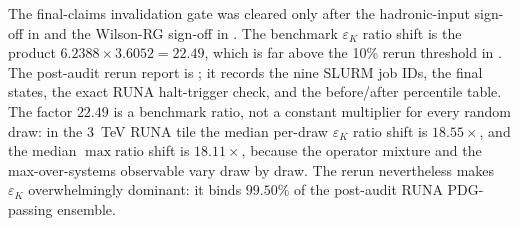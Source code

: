 \documentclass[11pt]{article}
\newcommand{\eK}{\varepsilon_K}
\begin{document}
The final-claims invalidation gate was cleared only after the
hadronic-input sign-off in
 and the Wilson-RG sign-off
in .  The benchmark
$\eK$ ratio shift is the product $6.2388\times3.6052=22.49$, which is
far above the 10\% rerun threshold in
.  The post-audit rerun report is
; it records the nine
SLURM job IDs, the final states, the exact RUNA halt-trigger check, and
the before/after percentile table.  The factor $22.49$ is a benchmark
ratio, not a constant multiplier for every random draw: in the 3~TeV
RUNA tile the median per-draw $\eK$ ratio shift is $18.55\times$, and
the median $\max\mathrm{ratio}$ shift is $18.11\times$, because the
operator mixture and the max-over-systems observable vary draw by draw.
The rerun nevertheless makes $\eK$ overwhelmingly dominant: it binds
$99.50\%$ of the post-audit RUNA PDG-passing ensemble.
\end{document}
